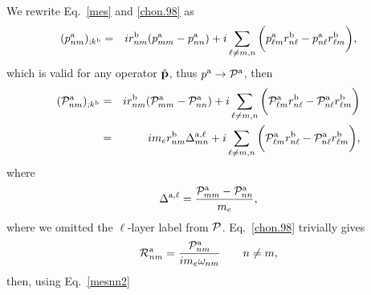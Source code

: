\documentclass[floatfix,prb,aps,superscriptaddress,11pt,preprint]{revtex4}
\begin{document}
We rewrite Eq.~\eqref{mes} and \eqref{chon.98} as
\begin{eqnarray}\label{mesnn}
(p^{\mathrm{a}}_{nm})_{;k^{\mathrm{b}}}&=& 
i 
r^{\mathrm{b}}_{nm}
(p^{\mathrm{a}}_{mm}-p^{\mathrm{a}}_{nn})
+i
\sum_{\ell\neq m,n}
\bigg( 
p^{\mathrm{a}}_{\ell m}
 r^{\mathrm{b}}_{n\ell}
- 
p^{\mathrm{a}}_{n\ell} 
r^{\mathrm{b}}_{\ell m}
\bigg)
,
\end{eqnarray} 
which is valid for any operator $\hat {\mathbf{p}}$, thus $p^{\mathrm{a}}\to{\cal
  P}^{\mathrm{a}}$, then
\begin{eqnarray}\label{mesnn2}
({\cal P}^{\mathrm{a}}_{nm})_{;k^{\mathrm{b}}}
&=&
i
r^{\mathrm{b}}_{nm}
({\cal P}^{\mathrm{a}}_{mm}-{\cal P}^{\mathrm{a}}_{nn})
+i
\sum_{\ell\neq m,n}
\bigg(
{\cal P}^{\mathrm{a}}_{\ell m}
 r^{\mathrm{b}}_{n\ell}
-
{\cal P}^{\mathrm{a}}_{n\ell}
r^{\mathrm{b}}_{\ell m}
\bigg)
\nonumber\\
&=&
im_e
r^{\mathrm{b}}_{nm}
\Delta^{\mathrm{a},\ell}_{mn}
+i
\sum_{\ell\neq m,n}
\bigg(
{\cal P}^{\mathrm{a}}_{\ell m}
 r^{\mathrm{b}}_{n\ell}
-
{\cal P}^{\mathrm{a}}_{n\ell}
r^{\mathrm{b}}_{\ell m}
\bigg)
,
\end{eqnarray}
where
\begin{equation}\label{l12}
\Delta^{\mathrm{a},\ell}
=\frac{{\cal P}^{\mathrm{a}}_{mm}-{\cal P}^{\mathrm{a}}_{nn}}{m_e}
,
\end{equation}
where we omitted the $\ell$-layer label from ${\cal P}$. 
Eq.~\eqref{chon.98} trivially gives
\begin{equation}\label{rnmenm69}
{\cal R}^{\mathrm{a}}_{nm}=\frac{{\cal P}^{\mathrm{a}}_{nm}}{im_e\omega_{nm}}
\quad\quad n\ne m
,
\end{equation}
then, using Eq.~\eqref{mesnn2}
\end{document}
